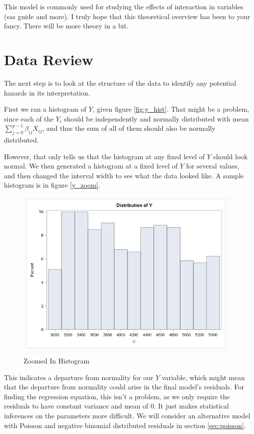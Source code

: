 This model is commonly used for studying the effects of interaction in variables (sas guide and more). I truly hope that this theoretical overview has been to your fancy. There will be more theory in a bit.


\section{Data Review}

The next step is to look at the structure of the data to identify any potential hazards in its interpretation. 

First we ran a histogram of $Y$, given figure \ref{fig:y_hist}. That might be a problem, since each of the $Y_i$ should be independently and normally distributed with mean $\sum_{j=0}^{p-1} \beta_{ij} X_{ij}$, and thus the sum of all of them should also be normally distributed. 

However, that only tells us that the histogram at any fixed level of $Y$ should look normal. We then generated a histogram at a fixed level of $Y$ for several values, and then changed the interval width to see what the data looked like. A sample histogram is in figure \ref{y_zoom}.

\begin{figure}
\centering
\includegraphics{Chapters/38now.png}
\caption{Zoomed In Histogram}
\label{fig:y_zoom}
\end{figure}

This indicates a departure from normality for our $Y$ variable, which might mean that the departure from normality could arise in the final model's residuals. For finding the regression equation, this isn't a problem, as we only require the residuals to have constant variance and mean of 0. It just makes statistical inferences on the parameters more difficult. We will consider an alternative model with Poisson and negative binomial distributed residuals in section \ref{sec:poisson}.



